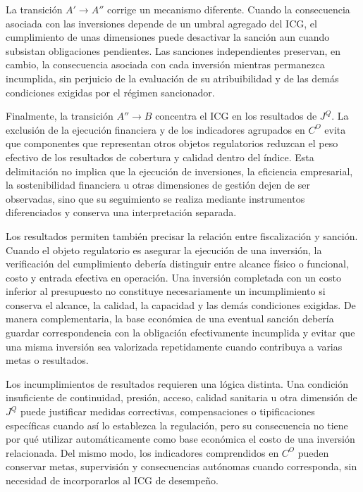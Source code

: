La transición \(A'\rightarrow A''\) corrige un mecanismo diferente. Cuando la consecuencia asociada con las inversiones depende de un umbral agregado del ICG, el cumplimiento de unas dimensiones puede desactivar la sanción aun cuando subsistan obligaciones pendientes. Las sanciones independientes preservan, en cambio, la consecuencia asociada con cada inversión mientras permanezca incumplida, sin perjuicio de la evaluación de su atribuibilidad y de las demás condiciones exigidas por el régimen sancionador.

Finalmente, la transición \(A''\rightarrow B\) concentra el ICG en los resultados de \(J^{Q}\). La exclusión de la ejecución financiera y de los indicadores agrupados en \(C^{O}\) evita que componentes que representan otros objetos regulatorios reduzcan el peso efectivo de los resultados de cobertura y calidad dentro del índice. Esta delimitación no implica que la ejecución de inversiones, la eficiencia empresarial, la sostenibilidad financiera u otras dimensiones de gestión dejen de ser observadas, sino que su seguimiento se realiza mediante instrumentos diferenciados y conserva una interpretación separada.

Los resultados permiten también precisar la relación entre fiscalización y sanción. Cuando el objeto regulatorio es asegurar la ejecución de una inversión, la verificación del cumplimiento debería distinguir entre alcance físico o funcional, costo y entrada efectiva en operación. Una inversión completada con un costo inferior al presupuesto no constituye necesariamente un incumplimiento si conserva el alcance, la calidad, la capacidad y las demás condiciones exigidas. De manera complementaria, la base económica de una eventual sanción debería guardar correspondencia con la obligación efectivamente incumplida y evitar que una misma inversión sea valorizada repetidamente cuando contribuya a varias metas o resultados.

Los incumplimientos de resultados requieren una lógica distinta. Una condición insuficiente de continuidad, presión, acceso, calidad sanitaria u otra dimensión de \(J^{Q}\) puede justificar medidas correctivas, compensaciones o tipificaciones específicas cuando así lo establezca la regulación, pero su consecuencia no tiene por qué utilizar automáticamente como base económica el costo de una inversión relacionada. Del mismo modo, los indicadores comprendidos en \(C^{O}\) pueden conservar metas, supervisión y consecuencias autónomas cuando corresponda, sin necesidad de incorporarlos al ICG de desempeño.

